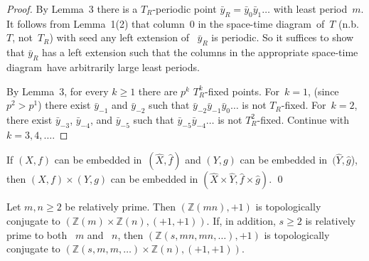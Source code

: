 \documentclass[12pt]{amsart}
\begin{document}
\begin{proof}

By Lemma~3 there is a $T_R$-periodic point
$\bar y_R = \bar y_0 \bar y_1 \dots$
with least period~$m$.
It follows from Lemma~1(2) 
that column~$0$ in the {space-time diagram}\ of~$T$ (n.b. $T$, not~$T_R$) 
with seed any left extension of
~$\bar y_R$ is periodic.  
So it suffices to show that
$\bar y_R$ has a left extension such that the columns in the appropriate
{space-time diagram}\ have arbitrarily large least periods.

By Lemma~3, for every $k \ge 1$ there are $p^k$ $T_R^k$-fixed points.
For~$k=1$, (since $p^2>p^1$) there exist $\bar y_{-1}$ and $\bar y_{-2}$ such that
$\bar y_{-2}\bar y_{-1}\bar y_0 \dots$ is not $T_R$-fixed.
For~$k=2$, there exist 
$\bar y_{-3}$, $\bar y_{-4}$,  and $\bar y_{-5}$ such that
$\bar y_{-5}\bar y_{-4} \dots$ is not $T_R^2$-fixed.
Continue with $k=3,4,\dots$.
\end{proof}

 
 

 

\begin{lemma}
If $(X,f)$ can be embedded in~$(\widehat X,\widehat f)$ and  $(Y,g)$ can be embedded in~$(\widehat Y,\widehat g$), then
$(X,f) \times (Y,g)$ can be embedded in
$(\widehat X \times \widehat Y, \widehat f \times \widehat g)$.
\qed
\end{lemma}

\begin{lemma}
Let $m,n \ge 2$ be relatively prime.
Then $({\mathbb Z}(mn),+1)$ is
topologically conjugate to
$({\mathbb Z}(m) \times {\mathbb Z}(n),(+1,+1))$.
If, in addition, $s \ge 2$ is relatively prime to both ~$m$ and ~$n$, then
$({\mathbb Z}(s,mn,mn,\dots),+1)$ is
topologically conjugate to
$({\mathbb Z}(s,m,m,\dots) \times {\mathbb Z}(n),(+1,+1))$.
 
\end{lemma}
\end{document}

